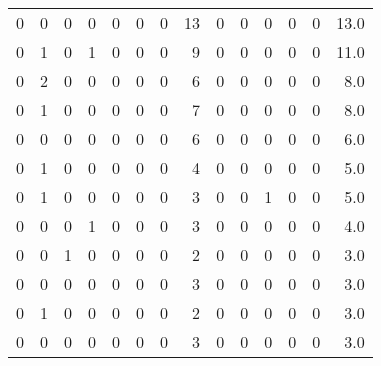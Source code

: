 \begin{tabular}{rrrrrrrrrrrrrr}
       0 &       0 &          0 &               0 &                0 &       0 &          0 &         13 &         0 &         0 &      0 &             0 &         0 &     13.0 \\
       0 &       1 &          0 &               1 &                0 &       0 &          0 &          9 &         0 &         0 &      0 &             0 &         0 &     11.0 \\
       0 &       2 &          0 &               0 &                0 &       0 &          0 &          6 &         0 &         0 &      0 &             0 &         0 &      8.0 \\
       0 &       1 &          0 &               0 &                0 &       0 &          0 &          7 &         0 &         0 &      0 &             0 &         0 &      8.0 \\
       0 &       0 &          0 &               0 &                0 &       0 &          0 &          6 &         0 &         0 &      0 &             0 &         0 &      6.0 \\
       0 &       1 &          0 &               0 &                0 &       0 &          0 &          4 &         0 &         0 &      0 &             0 &         0 &      5.0 \\
       0 &       1 &          0 &               0 &                0 &       0 &          0 &          3 &         0 &         0 &      1 &             0 &         0 &      5.0 \\
       0 &       0 &          0 &               1 &                0 &       0 &          0 &          3 &         0 &         0 &      0 &             0 &         0 &      4.0 \\
       0 &       0 &          1 &               0 &                0 &       0 &          0 &          2 &         0 &         0 &      0 &             0 &         0 &      3.0 \\
       0 &       0 &          0 &               0 &                0 &       0 &          0 &          3 &         0 &         0 &      0 &             0 &         0 &      3.0 \\
       0 &       1 &          0 &               0 &                0 &       0 &          0 &          2 &         0 &         0 &      0 &             0 &         0 &      3.0 \\
       0 &       0 &          0 &               0 &                0 &       0 &          0 &          3 &         0 &         0 &      0 &             0 &         0 &      3.0 \\

\end{tabular}
